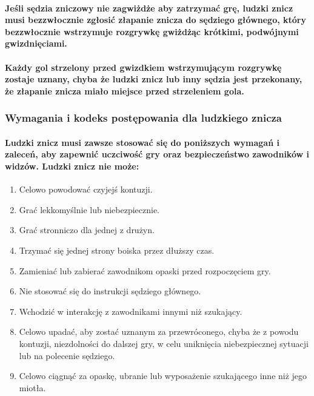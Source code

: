 \documentclass[12pt]{article}
\begin{document}
\paragraph{Jeśli sędzia zniczowy nie zagwiżdże aby zatrzymać grę,
ludzki znicz musi bezzwłocznie zgłosić złapanie znicza do sędziego
głównego, który bezzwłocznie wstrzymuje rozgrywkę gwiżdżąc krótkimi,
podwójnymi gwizdnięciami.}

\paragraph{Każdy gol strzelony przed gwizdkiem wstrzymującym
rozgrywkę zostaje uznany, chyba że ludzki znicz lub inny sędzia jest
przekonany, że złapanie znicza miało miejsce przed strzeleniem gola.}

\subsubsection{Wymagania i kodeks postępowania dla ludzkiego znicza}

\paragraph{Ludzki znicz musi zawsze stosować się do poniższych
wymagań i zaleceń, aby zapewnić uczciwość gry oraz bezpieczeństwo
zawodników i widzów. Ludzki znicz nie może:}

\begin{enumerate}
\item Celowo powodować czyjejś kontuzji.

\item Grać lekkomyślnie lub niebezpiecznie.

\item Grać stronniczo dla jednej z drużyn.

\item Trzymać się jednej strony boiska przez dłuższy czas.

\item Zamieniać lub zabierać zawodnikom opaski przed rozpoczęciem gry.

\item Nie stosować się do instrukcji sędziego głównego.

\item Wchodzić w interakcję z zawodnikami innymi niż szukający.

\item Celowo upadać, aby zostać uznanym za przewróconego, chyba że z powodu
kontuzji, niezdolności do dalszej gry, w celu uniknięcia niebezpiecznej
sytuacji lub na polecenie sędziego.

\item Celowo ciągnąć za opaskę, ubranie lub wyposażenie szukającego inne
niż jego miotła.
\end{enumerate}
\end{document}

